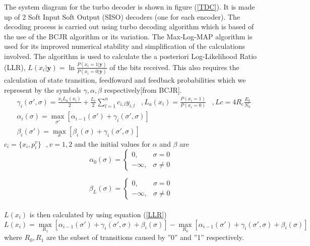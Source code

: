 \documentclass[20 pts]{article}
\begin{document}
 
 The system diagram for the turbo decoder is shown in figure (\ref{TDC}). It is made up of 2
 Soft Input Soft Output (SISO) decoders (one for each encoder). The decoding 
 process is carried out using turbo decoding algorithm which is based of the use of
 the BCJR algorithm or its variation.  The Max-Log-MAP algorithm is used 
 for its improved numerical stability and simplification of the calculations involved. 
 The algorithm is used to calculate the a posteriori Log-Likelihood Ratio (LLR),  
 $L(x_i|\mathbf{y})=\ln \frac{P(x_i=1|\mathbf{y})}{P(x_i=0|\mathbf{y})}$ 
 of the bits received. This also requires
 the calculation of state transition, feedfoward and feedback probabilities which we
 represent by the symbols $\gamma,\alpha, \beta $ respectively[from BCJR].
\begin{equation}
\begin{split}
&\gamma_i(\sigma',\sigma)=
\frac{x_i L_a (x_i)}{2}+
\frac{L_c}{2}\sum_{l=1}^{n} c_{i,l}y_{i,l}\,\,\,\,\, ,L_a(x_i) =\frac{P(x_i=1)}{P(x_i=0)}
\,\,\,\,\, ,Lc=4R_c\frac{E_b}{N_0}\\
&\alpha_i(\sigma)=\max_{\sigma'}[\alpha_{i-1}(\sigma')+\gamma_i(\sigma',\sigma)]\\
&\beta_i(\sigma')=\max_{\sigma}[\beta_{i}(\sigma)+\gamma_i(\sigma',\sigma)]
\end{split}
\label{abc}
\end{equation}
$c_i=\{x_i,p^{v}_i\}\,\,\,\, ,v=1,2$ and the initial values for $\alpha$ and $\beta$ are
\[
    \alpha_0(\sigma)= 
\begin{cases}
   0,& \sigma= 0\\        -\infty,              &  \sigma \neq 0
\end{cases}
\]

\[
   \beta_L(\sigma)= 
\begin{cases}
   0,& \sigma= 0\\        -\infty,              &  \sigma \neq 0
\end{cases}
\]
 \paragraph{}
$ L(x_i)$ is then calculated by using equation (\ref{LLR})
 \begin{equation}
 L(x_i)=\max_{R_1}[\alpha_{i-1}(\sigma')+ \gamma_i(\sigma',\sigma)+\beta_i(\sigma)]
 -
 \max_{R_0}[\alpha_{i-1}(\sigma')+ \gamma_i(\sigma',\sigma)+\beta_i(\sigma)]
\label{LLR}
\end{equation}
where $R_0,R_1$ are the subset of transitions caused by ''0'' and ''1'' respectively.
\end{document}
